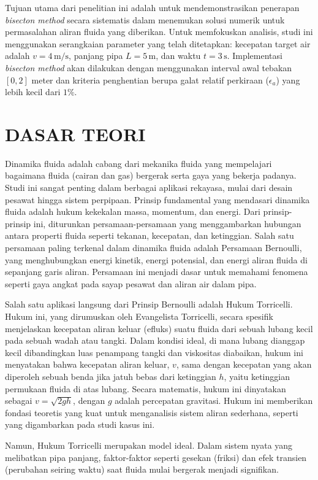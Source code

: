 \documentclass[conference]{IEEEtran}
\begin{document}
Tujuan utama dari penelitian ini adalah untuk mendemonstrasikan penerapan \textit{bisecton method} secara sistematis dalam menemukan solusi numerik untuk permasalahan aliran fluida yang diberikan. Untuk memfokuskan analisis, studi ini menggunakan serangkaian parameter yang telah ditetapkan: kecepatan target air adalah $v = 4 \, \text{m/s}$, panjang pipa $L = 5 \, \text{m}$, dan waktu $t = 3 \, \text{s}$. Implementasi \textit{bisecton method} akan dilakukan dengan menggunakan interval awal tebakan $[0, 2]$ meter dan kriteria penghentian berupa galat relatif perkiraan ($\epsilon_a$) yang lebih kecil dari $1\%$.

\section{DASAR TEORI}
Dinamika fluida adalah cabang dari mekanika fluida yang mempelajari bagaimana fluida (cairan dan gas) bergerak serta gaya yang bekerja padanya. Studi ini sangat penting dalam berbagai aplikasi rekayasa, mulai dari desain pesawat hingga sistem perpipaan. Prinsip fundamental yang mendasari dinamika fluida adalah hukum kekekalan massa, momentum, dan energi. Dari prinsip-prinsip ini, diturunkan persamaan-persamaan yang menggambarkan hubungan antara properti fluida seperti tekanan, kecepatan, dan ketinggian. Salah satu persamaan paling terkenal dalam dinamika fluida adalah Persamaan Bernoulli, yang menghubungkan energi kinetik, energi potensial, dan energi aliran fluida di sepanjang garis aliran. Persamaan ini menjadi dasar untuk memahami fenomena seperti gaya angkat pada sayap pesawat dan aliran air dalam pipa.

Salah satu aplikasi langsung dari Prinsip Bernoulli adalah Hukum Torricelli. Hukum ini, yang dirumuskan oleh Evangelista Torricelli, secara spesifik menjelaskan kecepatan aliran keluar (efluks) suatu fluida dari sebuah lubang kecil pada sebuah wadah atau tangki. Dalam kondisi ideal, di mana lubang dianggap kecil dibandingkan luas penampang tangki dan viskositas diabaikan, hukum ini menyatakan bahwa kecepatan aliran keluar, $v$, sama dengan kecepatan yang akan diperoleh sebuah benda jika jatuh bebas dari ketinggian $h$, yaitu ketinggian permukaan fluida di atas lubang. Secara matematis, hukum ini dinyatakan sebagai $v = \sqrt{2gh}$, dengan $g$ adalah percepatan gravitasi. Hukum ini memberikan fondasi teoretis yang kuat untuk menganalisis sistem aliran sederhana, seperti yang digambarkan pada studi kasus ini.

Namun, Hukum Torricelli merupakan model ideal. Dalam sistem nyata yang melibatkan pipa panjang, faktor-faktor seperti gesekan (friksi) dan efek transien (perubahan seiring waktu) saat fluida mulai bergerak menjadi signifikan. 
\end{document}
